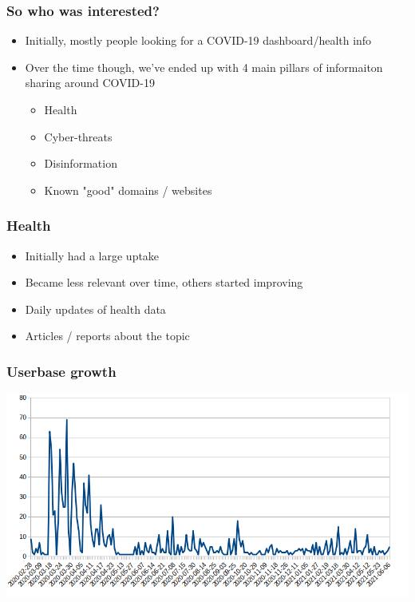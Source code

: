 \begin{frame}
 \frametitle{So who was interested?}
 \begin{itemize}
         \item Initially, mostly people looking for a COVID-19 dashboard/health info
         \item Over the time though, we've ended up with 4 main pillars of informaiton sharing around COVID-19
         \begin{itemize}
              \item Health
              \item Cyber-threats
              \item Disinformation
              \item Known "good" domains / websites
         \end{itemize}
 \end{itemize}
\end{frame}

\begin{frame}
 \frametitle{Health}
 \begin{itemize}
         \item Initially had a large uptake
         \item Became less relevant over time, others started improving
         \item Daily updates of health data
         \item Articles / reports about the topic
 \end{itemize}
\end{frame}

\begin{frame}
 \frametitle{Userbase growth}
 \includegraphics[width=0.8\linewidth]{user_regs_daily.png}
\end{frame}

